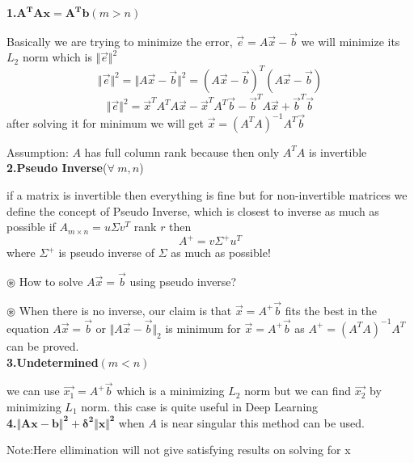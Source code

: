 \documentclass[a4paper]{article}
\numberwithin{equation}{section}
\begin{document}
\begin{itemize}
\textbf{1.$\mathbf{A^TA{x}=A^T{b}}(m>n)$}

Basically we are trying to minimize the error, $\vec{e}=A\vec{x}-\vec{b}$ we will minimize its $L_2$ norm which is $\Vert \vec{e} \Vert^2$
\[\Vert \vec{e} \Vert^2=\Vert A\vec{x}-\vec{b} \Vert^2=(A\vec{x}-\vec{b})^T(A\vec{x}-\vec{b})\]
\[\Vert \vec{e} \Vert^2=\vec{x}^TA^TA\vec{x}-\vec{x}^TA^T\vec{b}-\vec{b}^TA\vec{x}+\vec{b}^T\vec{b}\]
after solving it for minimum we will get $\vec{x}=(A^TA)^{-1}A^T\vec{b}$

Assumption: $A$ has full column rank because then only $A^TA$ is invertible
\\

\textbf{2.Pseudo Inverse}($\forall \hspace{3pt}m,n$)

if a matrix is invertible then everything is fine but for non-invertible matrices we define the concept of Pseudo Inverse, which is closest to inverse as much as possible if $A_{m\times n}=u\Sigma v^T$ rank $r$ then
\begin{equation}
    A^{+}=v\Sigma^+u^T \tag{Pseudo Inverse}
\end{equation}
where $\Sigma^+$ is pseudo inverse of $\Sigma$ as much as possible!

$\circledast$ How to solve $A\vec{x}=\vec{b}$ using pseudo inverse?

$\circledast$ When there is no inverse, our claim is that $\vec{x}=A^+\vec{b}$ fits the best in the equation $A\vec{x}=\vec{b}$ or $\Vert A\vec{x}-\vec{b}\Vert_2$  is minimum for $\vec{x}=A^+\vec{b}$ as $A^+=(A^TA)^{-1}A^T$ can be proved.
\\

\textbf{3.Undetermined$(m<n)$} 

we can use $\vec{x_1}=A^+\vec{b}$ which is a minimizing $L_2$ norm but we can find $\vec{x_2} $ by minimizing $L_1$  norm. this case is quite useful in Deep Learning
\\

\textbf{4.$\mathbf{\Vert Ax-b\Vert^2+{{\delta}^2\Vert x\Vert^2}}$} when $A$ is near singular this method can be used.

Note:Here ellimination will not give satisfying results on solving for x
\\


\end{itemize}
\end{document}
